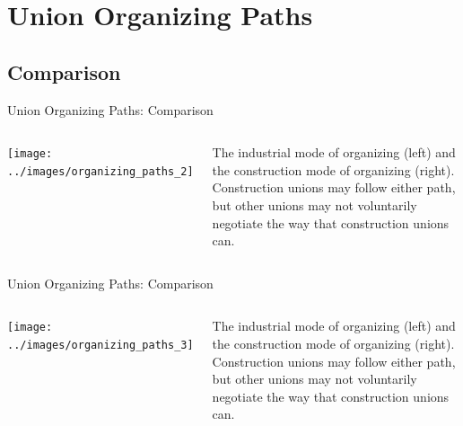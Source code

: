 \documentclass{beamer}
\begin{document}
\section*{Union Organizing Paths}
%    
%    
%

\subsection*{Comparison}

\begin{frame}{Union Organizing Paths: Comparison}
  \begin{columns}
    \texttt{[image: ../images/organizing\_paths\_2]}

    The industrial mode of organizing (left) and the construction mode of organizing (right).\newline\newline
    Construction unions may follow either path, but other unions may not voluntarily negotiate the way that construction unions can.
    \end{columns}
\end{frame}

\begin{frame}{Union Organizing Paths: Comparison}
  \begin{columns}
    \texttt{[image: ../images/organizing\_paths\_3]}

    The industrial mode of organizing (left) and the construction mode of organizing (right).\newline\newline
    Construction unions may follow either path, but other unions may not voluntarily negotiate the way that construction unions can.
    \end{columns}
\end{frame}
\end{document}
